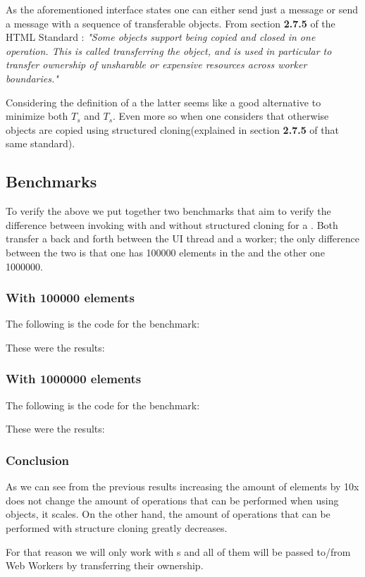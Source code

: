 As the aforementioned interface states one can either send just a message or send a message with a sequence of transferable objects. From section \textbf{2.7.5} of the HTML Standard \cite{html-whatwg}:
\textit{"Some objects support being copied and closed in one operation. This is called transferring the object, and is used in particular to transfer ownership of unsharable or expensive resources across worker boundaries."}

Considering the definition of a  the latter seems like a good alternative to minimize both \(T_{s}\) and \(T_{s}\). Even more so when one considers that otherwise objects are copied using structured cloning(explained in section \textbf{2.7.5} of that same standard).

\subsection{Benchmarks}
To verify the above we put together two benchmarks that aim to verify the difference between invoking  with and without structured cloning for a \ttarray{}. Both transfer a \ttarray{} back and forth between the UI thread and a worker; the only difference between the two is that one has 100000 elements in the \ttarray{} and the other one 1000000.

\subsubsection{With 100000 elements}
The following is the code for the benchmark:

These were the results:

\subsubsection{With 1000000 elements}
The following is the code for the benchmark:

These were the results:

\subsubsection{Conclusion}
As we can see from the previous results increasing the amount of elements by 10x does not change the amount of operations that can be performed when using  objects, it scales. On the other hand, the amount of operations that can be performed with structure cloning greatly decreases.

For that reason we will only work with {\ttarray{}}s and all of them will be passed to/from Web Workers by transferring their ownership.

\pagebreak